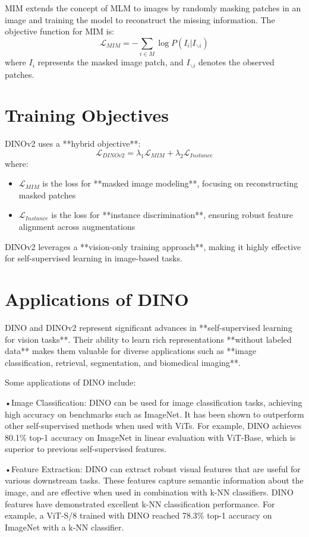 \documentclass[
]{book}
\begin{document}
MIM extends the concept of MLM to images by randomly masking patches in
an image and training the model to reconstruct the missing information.
The objective function for MIM is:
\[\mathcal{L}_{MIM} = - \sum_{i \in M} \log P(I_i | I_{\backslash i})\]
where \(I_i\) represents the masked image patch, and \(I_{\backslash i}\)
denotes the observed patches.

\section{Training Objectives}\label{training-objectives}

DINOv2 uses a **hybrid objective**:
\[\mathcal{L}_{DINOv2} = \lambda_1 \mathcal{L}_{MIM} + \lambda_2 \mathcal{L}_{Instance}\]
where:

\begin{itemize}
\item
  \(\mathcal{L}_{MIM}\) is the loss for **masked image modeling**,
  focusing on reconstructing masked patches
\item
  \(\mathcal{L}_{Instance}\) is the loss for **instance
  discrimination**, ensuring robust feature alignment across
  augmentations
\end{itemize}

DINOv2 leverages a **vision-only training approach**, making it
highly effective for self-supervised learning in image-based tasks.

\section{Applications of DINO}\label{applications-of-dino}

DINO and DINOv2 represent significant advances in **self-supervised
learning for vision tasks**. Their ability to learn rich
representations **without labeled data** makes them valuable for
diverse applications such as **image classification, retrieval,
segmentation, and biomedical imaging**.

Some applications of DINO include:

•Image Classification: DINO can be used for image classification tasks, achieving high accuracy on benchmarks such as ImageNet. It has been shown to outperform other self-supervised methods when used with ViTs. For example, DINO achieves 80.1\% top-1 accuracy on ImageNet in linear evaluation with ViT-Base, which is superior to previous self-supervised features.

•Feature Extraction: DINO can extract robust visual features that are useful for various downstream tasks. These features capture semantic information about the image, and are effective when used in combination with k-NN classifiers. DINO features have demonstrated excellent k-NN classification performance. For example, a ViT-S/8 trained with DINO reached 78.3\% top-1 accuracy on ImageNet with a k-NN classifier.
\end{document}

